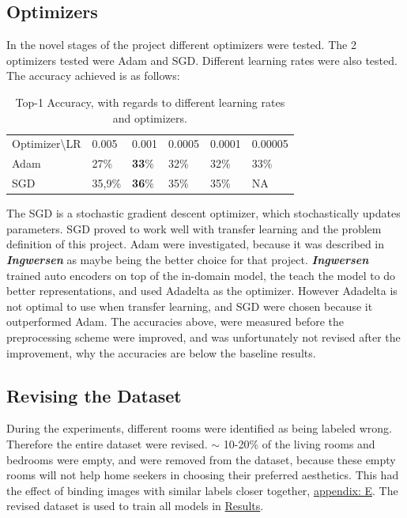 \subsection{Optimizers}
In the novel stages of the project different optimizers were tested. The 2 optimizers tested were Adam and SGD. Different learning rates were also tested. The accuracy achieved is as follows:
\begin{table}[H]
\centering
\begin{tabular}{llllll}
Optimizer\textbackslash{}LR & 0.005  & 0.001 & 0.0005 & 0.0001 & 0.00005 \\
Adam                        & 27\%   & \textbf{33}\%  & 32\%   & 32\%   & 33\%\\
SGD                         & 35,9\% & \textbf{36}\%  & 35\%   & 35\%   & NA
\end{tabular}
\caption{Top-1 Accuracy, with regards to different learning rates and optimizers.}
\end{table}
The SGD is a stochastic gradient descent optimizer, which stochastically updates parameters. SGD proved to work well with transfer learning and the problem definition of this project. Adam were investigated, because it was described in \textbf{\textit{Ingwersen}}\autocite{Ingwersen} as maybe being the better choice for that project. \textbf{\textit{Ingwersen}} trained auto encoders on top of the in-domain model, the teach the model to do better representations, and used Adadelta as the optimizer. However Adadelta is not optimal to use when transfer learning, and SGD were chosen because it outperformed Adam. The accuracies above, were measured before the preprocessing scheme were improved, and was unfortunately not revised after the improvement, why the accuracies are below the baseline results.

\subsection{Revising the Dataset}
During the experiments, different rooms were identified as being labeled wrong. Therefore the entire dataset were revised. $\sim$ 10-20\% of the living rooms and bedrooms were empty, and were removed from the dataset, because these empty rooms will not help home seekers in choosing their preferred aesthetics. This had the effect of binding images with similar labels closer together, \hyperref[appendix: E]{appendix: E}. 
The revised dataset is used to train all models in \hyperref[sec:Results]{Results}.
